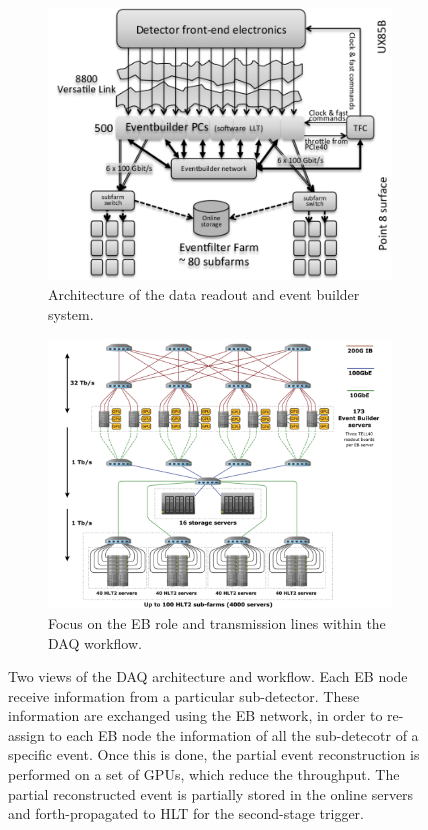 \begin{figure}
    \centering
    \begin{subfigure}{0.48\textwidth}
        \includegraphics[width=\linewidth]{figures/The-architecture-of-Upgraded-LHCb-readout-system.png}
    \caption{Architecture of the data readout and event builder system.}
    \label{fig:architecture_readout}
    \end{subfigure}
    \begin{subfigure}{0.48\textwidth}
         \includegraphics[width=\linewidth]{figures/RTA_trigger.png}
    \caption{Focus on the EB role and transmission lines within the DAQ workflow.}\label{fig:EB_zoom}
    \end{subfigure}
    \caption{Two views of the DAQ architecture and workflow. Each EB node receive information from a particular sub-detector. These information are exchanged using the EB network, in order to re-assign to each EB node the information of all the sub-detecotr of a specific event. Once this is done, the partial event reconstruction is performed on a set of GPUs, which reduce the throughput. The partial reconstructed event is partially stored in the online servers and forth-propagated to HLT for the second-stage trigger.}\label{fig:general_overview_trigger_RTA}
\end{figure}


